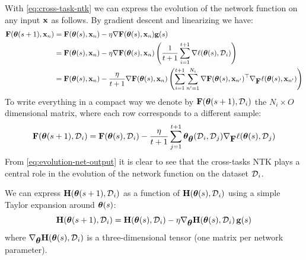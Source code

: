 \documentclass{article} %
\newcommand{\hessian}{\vH}
\begin{document}
With \cref{eq:cross-task-ntk} we can express the evolution of the network function on any input $\mbox{$\mbox{$\mathbf{x}$}$}$ as follows.  By gradient descent and linearizing we have:
\begin{align}
    \vF(\vparam(s+1), \vx_n) 
    &=  \vF(\vparam(s), \vx_n) - \eta \grad\vF(\vparam(s), \vx_n) \vg(s)\\
    \label{eq:deriv-step}
    &= \vF(\vparam(s), \vx_n) - \eta \grad\vF(\vparam(s), \vx_n) \rnd{\frac{1}{t+1}\sum_{i=1}^{t+1}{\grad\loss(\vparam(s), \data_i)}}\\
    &= \vF(\vparam(s), \vx_n) - \frac{\eta}{t+1} \grad\vF(\vparam(s), \vx_n) \rnd{\sum_{i=1}^{t+1}\sum_{n'=1}^{N_{i}}\grad\vF(\vparam(s), \vx_{n'})^\top\grad_{\vF}\loss(\vparam(s), \vx_{n'})}
\end{align}
To write everything in a compact way we denote by $\mbox{$\mbox{$\mathbf{F}$}$}(\mbox{$\mbox{$\boldsymbol{\theta}$}$}(s+1), \mbox{${\cal D}$}_i)$ the $N_i \times O$ dimensional matrix, where each row corresponds to a different sample: 
\begin{equation}
\label{eq:evolution-net-output}
    \vF(\vparam(s+1), \data_i) = \vF(\vparam(s), \data_i) - \frac{\eta}{t+1}\sum_{j=1}^{t+1}\vparam_{\vparam}(\data_i, \data_{j})\grad_{\vF}\loss(\vparam(s), \data_{j})
\end{equation}
From \cref{eq:evolution-net-output} it is clear to see that the cross-tasks NTK plays a central role in the evolution of the network function on the dataset $\mbox{${\cal D}$}_i$. 


We can express $\hessian(\vparam(s+1), \data_i)$ as a function of $\hessian(\vparam(s), \data_i)$ using a simple Taylor expansion around $\mbox{$\mbox{$\boldsymbol{\theta}$}$}(s)$:
\begin{equation}
    \label{eq:hessian-correction}
    \hessian(\vparam(s+1), \data_i) = \hessian(\vparam(s), \data_i) - \eta \grad_{\vparam}{\hessian(\vparam(s), \data_{i})} \, \vg(s)
\end{equation}
where $ \grad_{\vparam}{\hessian(\vparam(s), \data_{i})}$ is a three-dimensional tensor (one matrix per network parameter). 
\end{document}
